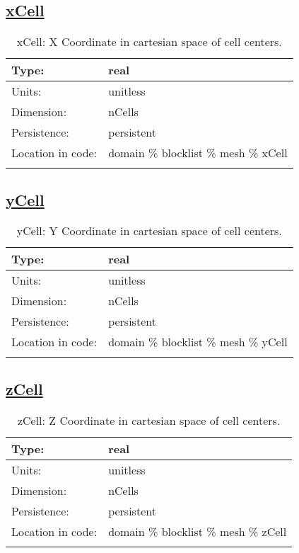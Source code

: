 \subsection[xCell]{\hyperref[sec:var_tab_mesh]{xCell}}
\label{subsec:var_sec_mesh_xCell}
\begin{center}
\begin{longtable}{| p{2.0in} | p{4.0in} |}
        \hline 
        Type: & real \\
        \hline 
        Units: & \si{unitless} \\
        \hline 
        Dimension: & nCells \\
        \hline 
        Persistence: & persistent \\
        \hline 
         Location in code: & domain \% blocklist \% mesh \% xCell \\
         \hline 
    \caption{xCell: X Coordinate in cartesian space of cell centers.}
\end{longtable}
\end{center}
\subsection[yCell]{\hyperref[sec:var_tab_mesh]{yCell}}
\label{subsec:var_sec_mesh_yCell}
\begin{center}
\begin{longtable}{| p{2.0in} | p{4.0in} |}
        \hline 
        Type: & real \\
        \hline 
        Units: & \si{unitless} \\
        \hline 
        Dimension: & nCells \\
        \hline 
        Persistence: & persistent \\
        \hline 
         Location in code: & domain \% blocklist \% mesh \% yCell \\
         \hline 
    \caption{yCell: Y Coordinate in cartesian space of cell centers.}
\end{longtable}
\end{center}
\subsection[zCell]{\hyperref[sec:var_tab_mesh]{zCell}}
\label{subsec:var_sec_mesh_zCell}
\begin{center}
\begin{longtable}{| p{2.0in} | p{4.0in} |}
        \hline 
        Type: & real \\
        \hline 
        Units: & \si{unitless} \\
        \hline 
        Dimension: & nCells \\
        \hline 
        Persistence: & persistent \\
        \hline 
         Location in code: & domain \% blocklist \% mesh \% zCell \\
         \hline 
    \caption{zCell: Z Coordinate in cartesian space of cell centers.}
\end{longtable}
\end{center}
